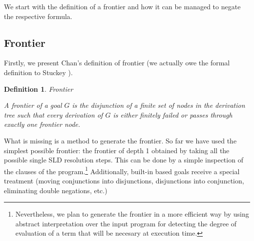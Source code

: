 \documentclass{tlp}
\newtheorem{definition}{Definition} %
\newcommand{\naf}{{\em naf}}\newcommand{\viejo}[1]{}
\begin{document}


We start with the definition of a frontier and how it can be managed
to negate the respective formula.

\vspace{-0.1in}

\subsection{Frontier}
\label{frontier}

Firstly, we present Chan's definition of frontier (we actually owe the formal
definition to Stuckey \cite{Stuckey95}).

\begin{definition}{\em Frontier}

A frontier of a goal $G$ is the disjunction of a finite set of nodes
in the derivation tree such that every derivation of $G$ is either
finitely failed or passes through exactly one {\em frontier node}.
\end{definition}

What is missing is a method to generate the frontier. So far we have
used the simplest possible frontier: the frontier of depth 1 obtained
by taking all the possible single SLD resolution steps. This can be
done by a simple inspection of the clauses of the
program.\footnote{Nevertheless, we plan to generate the frontier in a
more efficient way by using abstract interpretation over the input
program for detecting the degree of evaluation of a term that will be
necesary at execution time.} Additionally, built-in based goals
receive a special treatment (moving conjunctions into disjunctions,
disjunctions into conjunction, eliminating double negations, etc.)
\end{document}
